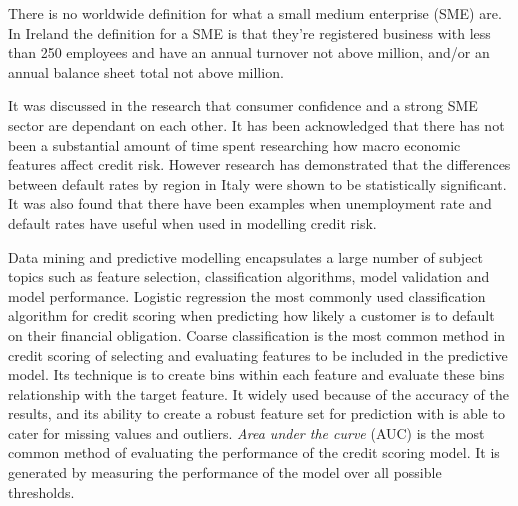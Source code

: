 There is no worldwide definition for what a small medium enterprise (SME) are. In Ireland the definition for a SME is that they're registered business with less than 250 employees and have an annual turnover not above  million, and/or an annual balance sheet total not above  million.

It was discussed in the research that consumer confidence and a strong SME sector are dependant on each other. It has been acknowledged that there has not been a substantial amount of time spent researching how macro economic features affect credit risk. However research has demonstrated that the differences between default rates by region in Italy were shown to be statistically significant. It was also found that there have been examples when unemployment rate and default rates have useful when used in modelling credit risk.

Data mining and predictive modelling encapsulates a large number of subject topics such as feature selection, classification algorithms, model validation and model performance. Logistic regression the most commonly used classification algorithm for credit scoring when predicting how likely a customer is to default on their financial obligation. Coarse classification is the most common method in credit scoring of selecting and evaluating features to be included in the predictive model. Its technique is to create bins within each feature and evaluate these bins relationship with the target feature. It widely used because of the accuracy of the results, and its ability to create a robust feature set for prediction with is able to cater for missing values and outliers. \textit{Area under the curve} (AUC) is the most common method of evaluating the performance of the credit scoring model. It is generated by measuring the performance of the model over all possible thresholds.

